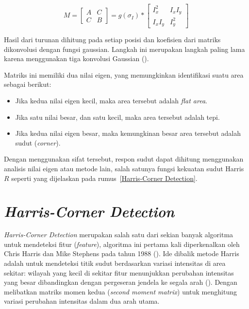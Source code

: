 \begin{equation}
  M = 
    \begin{bmatrix}
      A & C \\
      C & B
    \end{bmatrix}
    = g(\sigma_{I}) *
      \begin{bmatrix}
        I_{x}^2 & I_{x}I_{y} \\
        I_{x}I_{y} & I_{y}^2
      \end{bmatrix}
  \label{eq:SecondMomentMatrix}
\end{equation}

Hasil dari turunan dihitung pada setiap posisi dan koefisien dari matriks dikonvolusi dengan fungsi gaussian. Langkah ini merupakan langkah paling lama karena menggunakan tiga konvolusi Gaussian (\cite[hlm. 307]{Sanchez2018}). 

Matriks ini memiliki dua nilai eigen, yang memungkinkan identifikasi suatu area sebagai berikut:

\begin{itemize}
  \item Jika kedua nilai eigen kecil, maka area tersebut adalah \emph{flat area}.
  \item Jika satu nilai besar, dan satu kecil, maka area tersebut adalah tepi.
  \item Jika kedua nilai eigen besar, maka kemungkinan besar area tersebut adalah sudut (\emph{corner}).
\end{itemize}

Dengan menggunakan sifat tersebut, respon sudut dapat dihitung menggunakan analisis nilai eigen atau metode lain, salah satunya fungsi kekuatan sudut Harris \(R\) seperti yang dijelaskan pada rumus~\ref{Harris-Corner Detection}.

\section{\emph{Harris-Corner Detection}}
  \emph{Harris-Corner Detection} merupakan salah satu dari sekian banyak algoritma untuk mendeteksi fitur (\emph{feature}), algoritma ini pertama kali diperkenalkan oleh Chris Harris dan Mike Stephens pada tahun 1988 (\cite{Harris2013}). 
Ide dibalik metode Harris adalah untuk mendeteksi titik sudut berdasarkan variasi intensitas di area sekitar: wilayah yang kecil di sekitar fitur menunjukkan perubahan intensitas yang besar dibandingkan dengan pergeseran jendela ke segala arah (\cite[hlm. 305--308]{Sanchez2018}).
Dengan melibatkan matriks momen kedua (\emph{second moment matrix}) untuk menghitung variasi perubahan intensitas dalam dua arah utama.


